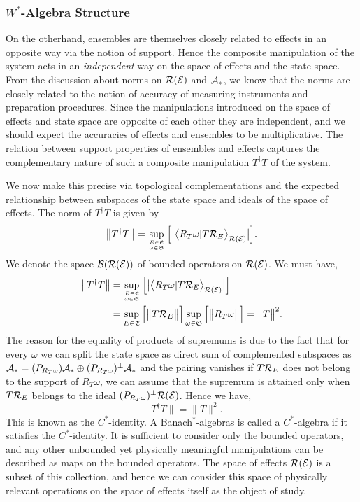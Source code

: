 \documentclass[11pt]{article}
\begin{document}
\subsubsection*{$W^*$-Algebra Structure}
On the otherhand, ensembles are themselves closely related to effects in an opposite way via the notion of support. Hence the composite manipulation of the system acts in an \emph{independent} way on the space of effects and the state space. From the discussion about norms on $\mathcal{R}(\mathcal{E})$ and $\mathcal{A}_* $, we know that the norms are closely related to the notion of accuracy of measuring instruments and preparation procedures. Since the manipulations introduced on the space of effects and state space are opposite of each other they are independent, and we should expect the accuracies of effects and ensembles to be multiplicative. The relation between support properties of ensembles and effects captures the complementary nature of such a composite manipulation $T^\dagger T$ of the system.

We now make this precise via topological complementations and the expected relationship between subspaces of the state space and ideals of the space of effects. The norm of $T^\dagger T$ is given by
$$\big\| T^\dagger T\big\|=\sup_{E\in \mathfrak{E}\atop\omega\in \mathfrak{S}}\Big[ \big|\big\langle R_T\omega|T\mathcal{R}_E\big\rangle_{\mathcal{R}(\mathcal{E})}\big| \Big].$$
We denote the space ${\mathcal{B}(\mathcal{R}(\mathcal{E}))}$ of bounded operators on $\mathcal{R}(\mathcal{E})$. We must have,
\begin{align*}
	\big\| T^\dagger T\big\|&=\sup_{E\in \mathfrak{E}\atop\omega\in \mathfrak{S}}\Big[ \big|\big\langle R_T\omega|T\mathcal{R}_E\big\rangle_{\mathcal{R}(\mathcal{E})}\big| \Big]\\&=\sup_{E\in \mathfrak{E}}\Big[\big\|T\mathcal{R}_E\big\|\Big]\sup_{\omega\in \mathfrak{S}}\Big[\big\|R_T\omega\big\|\Big]=\big\| T\big\|^2.
\end{align*}
The reason for the equality of products of supremums is due to the fact that for every $\omega$ we can split the state space as direct sum of complemented subspaces as 
$\mathcal{A}_* =(P_{R_T\omega})\mathcal{A}_* \oplus ({P_{R_T\omega}})^\perp \mathcal{A}_*$ and the pairing vanishes if $T\mathcal{R}_E$ does not belong to the support of $R_T\omega$, we can assume that the supremum is attained only when $T\mathcal{R}_E$ belongs to the ideal $({P_{R_T\omega}})^\perp \mathcal{R}(\mathcal{E})$. Hence we have,
$$\big\|T^\dagger T\big\|=\big\|T\big\|^2.$$
This is known as the $C^*$-identity. A Banach$^*$-algebras is called a $C^*$-algebra if it satisfies the $C^*$-identity. It is sufficient to consider only the bounded operators, and any other unbounded yet physically meaningful manipulations can be described as maps on the bounded operators. The space of effects $\mathcal{R}(\mathcal{E})$ is a subset of this collection, and hence we can consider this space of physically relevant operations on the space of effects itself as the object of study.
\end{document}
